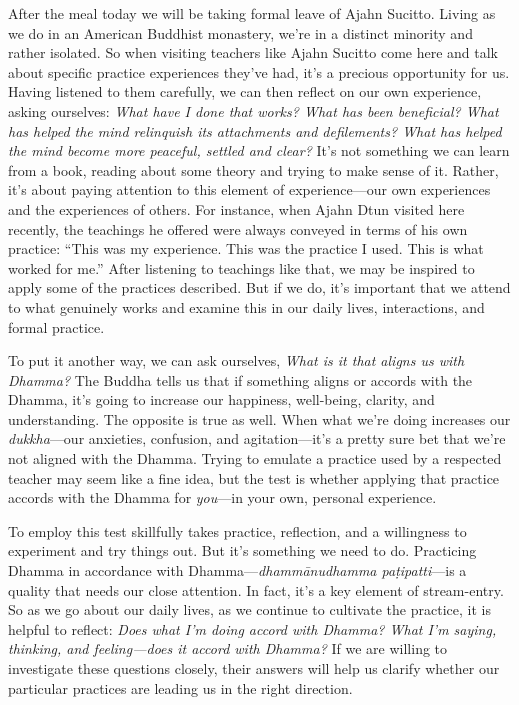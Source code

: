 After the meal today we will be taking formal leave of Ajahn Sucitto. 
Living as we do in an American Buddhist monastery, we're in a distinct 
minority and rather isolated. So when visiting teachers like Ajahn 
Sucitto come here and talk about specific practice experiences they've 
had, it's a precious opportunity for us. Having listened to them 
carefully, we can then reflect on our own experience, asking ourselves: 
\emph{What have I done that works? What has been beneficial? What has 
helped the mind relinquish its attachments and defilements? What has 
helped the mind become more peaceful, settled and clear?} It's not 
something we can learn from a book, reading about some theory and 
trying to make sense of it. Rather, it's about paying attention to this 
element of experience---our own experiences and the experiences of 
others. For instance, when Ajahn Dtun visited here recently, the 
teachings he offered were always conveyed in terms of his own practice: 
``This was my experience. This was the practice I used. This is what 
worked for me.'' After listening to teachings like that, we may be 
inspired to apply some of the practices described. But if we do, it's 
important that we attend to what genuinely works and examine this in 
our daily lives, interactions, and formal practice.

To put it another way, we can ask ourselves, \emph{What is it that 
aligns us with Dhamma?} The Buddha tells us that if something aligns or 
accords with the Dhamma, it's going to increase our happiness, 
well-being, clarity, and understanding. The opposite is true as well. 
When what we're doing increases our \emph{dukkha}---our anxieties, 
confusion, and agitation---it's a pretty sure bet that we're not 
aligned with the Dhamma. Trying to emulate a practice used by a 
respected teacher may seem like a fine idea, but the test is whether 
applying that practice accords with the Dhamma for \emph{you}---in your 
own, personal experience.

To employ this test skillfully takes practice, reflection, and a 
willingness to experiment and try things out. But it's something we 
need to do. Practicing Dhamma in accordance with 
Dhamma---\emph{dhammānudhamma paṭipatti}---is a quality that needs 
our close attention. In fact, it's a key element of stream-entry. So as 
we go about our daily lives, as we continue to cultivate the practice, 
it is helpful to reflect: \emph{Does what I'm doing accord with Dhamma? 
What I'm saying, thinking, and feeling---does it accord with Dhamma?} 
If we are willing to investigate these questions closely, their answers 
will help us clarify whether our particular practices are leading us in 
the right direction.


